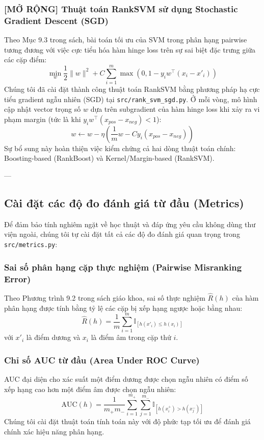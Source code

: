 \subsubsection{[MỞ RỘNG] Thuật toán RankSVM sử dụng Stochastic Gradient Descent (SGD)}
Theo Mục 9.3 trong sách, bài toán tối ưu của SVM trong phân hạng pairwise tương đương với việc cực tiểu hóa hàm hinge loss trên sự sai biệt đặc trưng giữa các cặp điểm:
\begin{equation}
    \min_{w} \frac{1}{2} \|w\|^2 + C \sum_{i=1}^m \max\left(0, 1 - y_i w^\top(x_i - x'_i)\right)
\end{equation}
Chúng tôi đã cài đặt thành công thuật toán RankSVM bằng phương pháp hạ cực tiểu gradient ngẫu nhiên (SGD) tại \texttt{src/rank_svm_sgd.py}. Ở mỗi vòng, mô hình cập nhật vector trọng số $w$ dựa trên subgradient của hàm hinge loss khi xảy ra vi phạm margin (tức là khi $y_i w^\top(x_{pos} - x_{neg}) < 1$):
\begin{equation}
    w \leftarrow w - \eta \left( \frac{1}{m} w - C y_i (x_{pos} - x_{neg}) \right)
\end{equation}
Sự bổ sung này hoàn thiện việc kiểm chứng cả hai dòng thuật toán chính: Boosting-based (RankBoost) và Kernel/Margin-based (RankSVM).

---

\subsection{Cài đặt các độ đo đánh giá từ đầu (Metrics)}
Để đảm bảo tính nghiêm ngặt về học thuật và đáp ứng yêu cầu không dùng thư viện ngoài, chúng tôi tự cài đặt tất cả các độ đo đánh giá quan trọng trong \texttt{src/metrics.py}:

\subsubsection{Sai số phân hạng cặp thực nghiệm (Pairwise Misranking Error)}
Theo Phương trình 9.2 trong sách giáo khoa, sai số thực nghiệm $\widehat{R}(h)$ của hàm phân hạng được tính bằng tỷ lệ các cặp bị xếp hạng ngược hoặc bằng nhau:
\begin{equation}
    \widehat{R}(h) = \frac{1}{m} \sum_{i=1}^m \mathbb{I}_{[h(x'_{i}) \le h(x_i)]}
\end{equation}
với $x'_i$ là điểm dương và $x_i$ là điểm âm trong cặp thứ $i$.

\subsubsection{Chỉ số AUC từ đầu (Area Under ROC Curve)}
AUC đại diện cho xác suất một điểm dương được chọn ngẫu nhiên có điểm số xếp hạng cao hơn một điểm âm được chọn ngẫu nhiên:
\begin{equation}
    \text{AUC}(h) = \frac{1}{m_+ m_-} \sum_{i=1}^{m_+} \sum_{j=1}^{m_-} \mathbb{I}_{[h(x^+_i) > h(x^-_j)]}
\end{equation}
Chúng tôi cài đặt thuật toán tính toán này với độ phức tạp tối ưu để đánh giá chính xác hiệu năng phân hạng.

